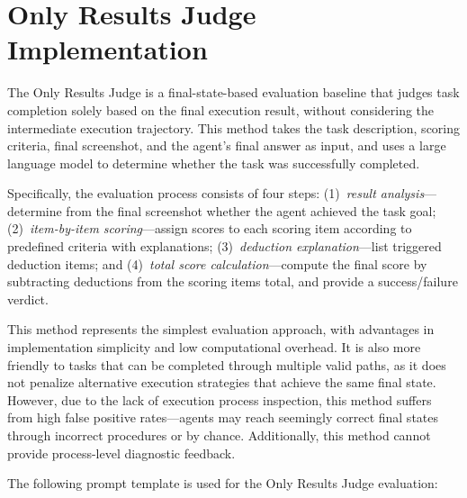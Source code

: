 
\section{Only Results Judge Implementation}
\label{app:only_results_judge}


The Only Results Judge is a final-state-based evaluation baseline that judges task completion solely based on the final execution result, without considering the intermediate execution trajectory. This method takes the task description, scoring criteria, final screenshot, and the agent's final answer as input, and uses a large language model to determine whether the task was successfully completed.

Specifically, the evaluation process consists of four steps: (1)~\textit{result analysis}---determine from the final screenshot whether the agent achieved the task goal; (2)~\textit{item-by-item scoring}---assign scores to each scoring item according to predefined criteria with explanations; (3)~\textit{deduction explanation}---list triggered deduction items; and (4)~\textit{total score calculation}---compute the final score by subtracting deductions from the scoring items total, and provide a success/failure verdict.

This method represents the simplest evaluation approach, with advantages in implementation simplicity and low computational overhead. It is also more friendly to tasks that can be completed through multiple valid paths, as it does not penalize alternative execution strategies that achieve the same final state. However, due to the lack of execution process inspection, this method suffers from high false positive rates---agents may reach seemingly correct final states through incorrect procedures or by chance. Additionally, this method cannot provide process-level diagnostic feedback.

\vspace{0.5em}
\noindent The following prompt template is used for the Only Results Judge evaluation:

